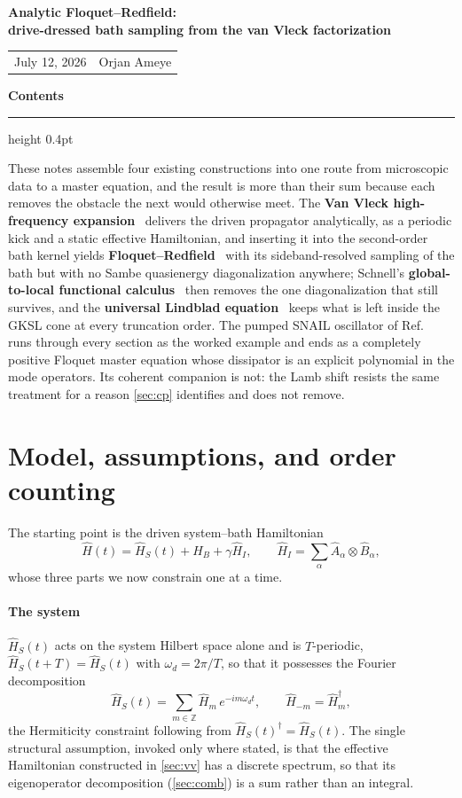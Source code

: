 \documentclass[a4paper,11pt]{article}
\makeatletter
\newcommand{\titlebanner}{%
  \noindent
  \begin{tcolorbox}[colback=boxbg,colframe=boxbg,arc=3pt,boxrule=0pt,
    left=10pt,right=10pt,top=8pt,bottom=8pt,width=\textwidth]
    {\color{maintext}\bfseries\LARGE Analytic Floquet--Redfield:\\[2pt]
    drive-dressed bath sampling from the van Vleck factorization}\\[8pt]
    {\color{maintext}\small\setlength{\tabcolsep}{0pt}%
      \begin{tabular*}{\linewidth}{@{}l@{\extracolsep{\fill}}r@{}}
        July 12, 2026 & Orjan Ameye
    \end{tabular*}}
  \end{tcolorbox}\vspace{0.6\baselineskip}
}
\newcommand{\tocbanner}{%
  \noindent
  \begin{tcolorbox}[colback=boxbg,colframe=boxbg,arc=3pt,boxrule=0pt,
    left=10pt,right=10pt,top=8pt,bottom=10pt,width=\textwidth]
    {\color{accent}\bfseries Contents}\par\vspace{3pt}
    {\color{rulecol}\hrule height 0.4pt}\vspace{4pt}
    \begingroup
      \setlength{\parskip}{0pt}%
      \hypersetup{linkcolor=maintext}%
      \@starttoc{toc}%
    \endgroup
  \end{tcolorbox}\vspace{0.6\baselineskip}
}
\makeatother
\begin{document}
\titlebanner

\tocbanner

These notes assemble four existing constructions into one route from microscopic data to a master equation, and the result is more than their sum because each removes the obstacle the next would otherwise meet. The \textbf{Van Vleck high-frequency expansion}~\cite{Eckardt2015High} delivers the driven propagator analytically, as a periodic kick and a static effective Hamiltonian, and inserting it into the second-order bath kernel yields \textbf{Floquet--Redfield}~\cite{Grifoni1998Driven,hone2009Statisticala} with its sideband-resolved sampling of the bath but with no Sambe quasienergy diagonalization anywhere; Schnell's \textbf{global-to-local functional calculus}~\cite{Schnell2025Global} then removes the one diagonalization that still survives, and the \textbf{universal Lindblad equation}~\cite{Nathan2020Universal} keeps what is left inside the GKSL cone at every truncation order. The pumped SNAIL oscillator of Ref.~\cite{Venkatraman2024Nonlinear} runs through every section as the worked example and ends as a completely positive Floquet master equation whose dissipator is an explicit polynomial in the mode operators. Its coherent companion is not: the Lamb shift resists the same treatment for a reason \cref{sec:cp} identifies and does not remove.

\section{Model, assumptions, and order counting}\label{sec:setup}

The starting point is the driven system--bath Hamiltonian
\begin{equation}\label{eq:htot}
  \hat H(t) = \hat H_S(t) + \hat H_B + \gamma\hat H_I,
  \qquad
  \hat H_I = \sum_\alpha \hat A_\alpha \otimes \hat B_\alpha,
\end{equation}
whose three parts we now constrain one at a time.

\paragraph{The system}
$\hat H_S(t)$ acts on the system Hilbert space alone and is $T$-periodic, $\hat H_S(t+T) = \hat H_S(t)$ with $\omega_d = 2\pi/T$, so that it possesses the Fourier decomposition
\begin{equation}\label{eq:fourierH}
  \hat H_S(t) = \sum_{m\in\mathbb Z} \hat H_m\, e^{-i m\omega_d t},
  \qquad
  \hat H_{-m} = \hat H_m^\dagger ,
\end{equation}
the Hermiticity constraint following from $\hat H_S(t)^\dagger = \hat H_S(t)$.
The single structural assumption, invoked only where stated, is that the effective Hamiltonian constructed in \cref{sec:vv} has a discrete spectrum, so that its eigenoperator decomposition (\cref{sec:comb}) is a sum rather than an integral.
\end{document}
